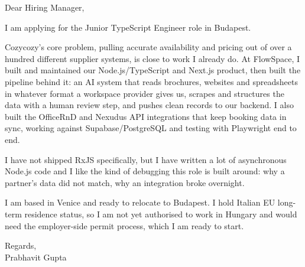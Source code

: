 \documentclass[a4paper,11pt]{article}
\begin{document}
Dear Hiring Manager,

I am applying for the Junior TypeScript Engineer role in Budapest.

Cozycozy's core problem, pulling accurate availability and pricing out of over a hundred different supplier systems, is close to work I already do. At FlowSpace, I built and maintained our Node.js/TypeScript and Next.js product, then built the pipeline behind it: an AI system that reads brochures, websites and spreadsheets in whatever format a workspace provider gives us, scrapes and structures the data with a human review step, and pushes clean records to our backend. I also built the OfficeRnD and Nexudus API integrations that keep booking data in sync, working against Supabase/PostgreSQL and testing with Playwright end to end.

I have not shipped RxJS specifically, but I have written a lot of asynchronous Node.js code and I like the kind of debugging this role is built around: why a partner's data did not match, why an integration broke overnight.

I am based in Venice and ready to relocate to Budapest. I hold Italian EU long-term residence status, so I am not yet authorised to work in Hungary and would need the employer-side permit process, which I am ready to start.

Regards,\\
Prabhavit Gupta
\end{document}

